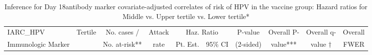 \begin{longtable}{lccccccccc}
\caption{Inference for Day 18antibody marker covariate-adjusted correlates of risk of HPV in the vaccine group: Hazard ratios for Middle vs. Upper tertile vs. Lower tertile*} \\ 
   \hline
 
         \multicolumn{1}{l}{IARC_HPV} & \multicolumn{1}{c}{Tertile}   & \multicolumn{1}{c}{No. cases /}   & \multicolumn{1}{c}{Attack}   & \multicolumn{2}{c}{Haz. Ratio}                     & \multicolumn{1}{c}{P-value}   & \multicolumn{1}{c}{Overall P-}      & \multicolumn{1}{c}{Overall q-}   & \multicolumn{1}{c}{Overall} \\ 
         \multicolumn{1}{l}{Immunologic Marker}            & \multicolumn{1}{c}{}          & \multicolumn{1}{c}{No. at-risk**} & \multicolumn{1}{c}{rate}   & \multicolumn{1}{c}{Pt. Est.} & \multicolumn{1}{c}{95\% CI} & \multicolumn{1}{c}{(2-sided)} & \multicolumn{1}{c}{value***} & \multicolumn{1}{c}{value $\dagger$} & \multicolumn{1}{c}{FWER} \\ 
         \hline
 

\end{longtable}
